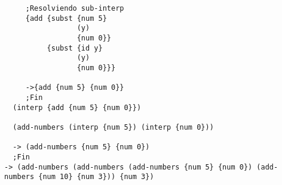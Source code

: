 \documentclass[a4paper]{article}
\begin{document}
\color{blue}
\begin{verbatim}
     ;Resolviendo sub-interp
     {add {subst {num 5}
                 (y)
                 {num 0}}
          {subst {id y}
                 (y)
                 {num 0}}}

     ->{add {num 5} {num 0}}
     ;Fin
  (interp {add {num 5} {num 0}})

  (add-numbers (interp {num 5}) (interp {num 0}))

  -> (add-numbers {num 5} {num 0})
  ;Fin
-> (add-numbers (add-numbers (add-numbers {num 5} {num 0}) (add-numbers {num 10} {num 3})) {num 3})
\end{verbatim}
\end{document}
